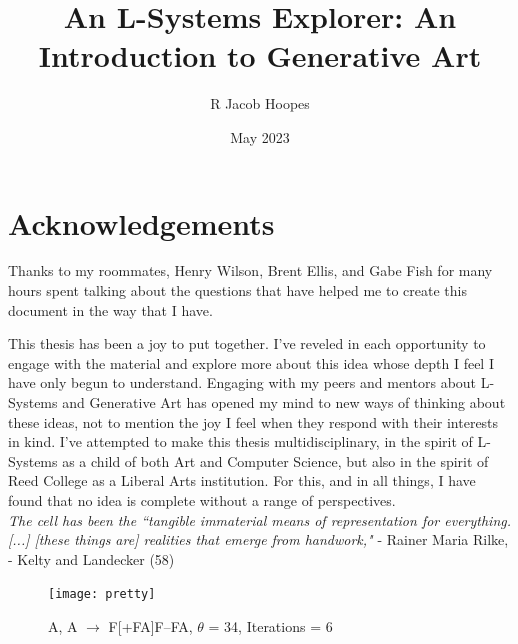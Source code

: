 \documentclass[12pt,twoside]{reedthesis}
\title{An L-Systems Explorer: An Introduction to Generative Art} %
\author{R Jacob Hoopes}
\date{May 2023}
\begin{document}
  \maketitle
  \frontmatter %
  \pagestyle{empty} %

    \chapter*{Acknowledgements}
	Thanks to my roommates, Henry Wilson, Brent Ellis, and Gabe Fish for many hours spent talking about the questions that have helped me to create this document in the way that I have.
	
	This thesis has been a joy to put together. I've reveled in each opportunity to engage with the material and explore more about this idea whose depth I feel I have only begun to understand. Engaging with my peers and mentors about L-Systems and Generative Art has opened my mind to new ways of thinking about these ideas, not to mention the joy I feel when they respond with their interests in kind. I've attempted to make this thesis multidisciplinary, in the spirit of L-Systems as a child of both Art and Computer Science, but also in the spirit of Reed College as a Liberal Arts institution. For this, and in all things, I have found that no idea is complete without a range of perspectives.\\
	
	\textit{The cell has been the ``tangible immaterial means of representation for everything. [...] [these things are] realities that emerge from handwork,"} - Rainer Maria Rilke, - Kelty and Landecker (58)\\
	
	
	\begin{figure}[h]
	\centering
	\texttt{[image: pretty]}
	\caption{A, A $\rightarrow$ F[+FA]F–FA, $\theta$ = 34, Iterations = 6}
	\label {Acknowledgements 1}
	\end{figure}
	


    \tableofcontents
	\listoffigures

\end{document}
